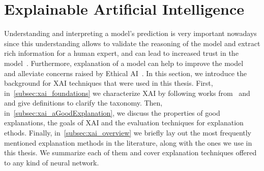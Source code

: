 \section{Explainable Artificial Intelligence}
\label{sec:explainableArtificialIntelligence}
Understanding and interpreting a model's prediction is very important nowadays since this understanding allows to validate the reasoning of the model and extract rich information for a human expert, and can lead to increased trust in the model~\parencite{WhyShouldITrustYou_Riberio}. Furthermore, explanation of a model can help to improve the model~\parencite{AUnifiedApproach_Lundberg} and alleviate concerns raised by Ethical AI~\parencite{MachineBias_Angwin, EURegulationsOnDecisionMaking_Goodman}.
In this section, we introduce the background for XAI techniques that were used in this thesis. First, in~\ref{subsec:xai_foundations} we characterize XAI by following works from~\cite{TheMythosOfModelInterpretability_Lipton} and~\cite{XAIConceptsTaxonomies_Arrieta} and give definitions to clarify the taxonomy. Then, in~\ref{subsec:xai_aGoodExplanation}, we discuss the properties of good explanations, the goals of XAI and the evaluation techniques for explanation ethods. Finally, in~\ref{subsec:xai_overview} we briefly lay out the most frequently mentioned explanation methods in the literature, along with the ones we use in this thesis. We summarize each of them and cover explanation techniques offered to any kind of neural network.

